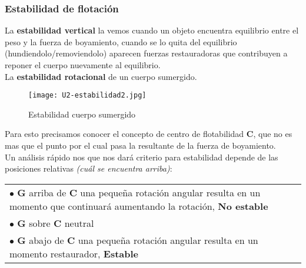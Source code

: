 \subsubsection{Estabilidad de flotación}
La \textbf{estabilidad vertical} la vemos cuando un objeto encuentra equilibrio entre el peso y la fuerza de boyamiento, cuando se lo quita del equilibrio (hundiendolo/removiendolo) aparecen fuerzas restauradoras que contribuyen a reponer el cuerpo nuevamente al equilibrio.\\
La \textbf{estabilidad rotacional} de un cuerpo sumergido.

\begin{figure}[!h]
	\centering
	\texttt{[image: U2-estabilidad2.jpg]}
	\caption{Estabilidad cuerpo sumergido}
	\label{fig:est-cuerp-sum}
\end{figure}


Para esto precisamos conocer el concepto de centro de flotabilidad $\textbf{C}$, que no es mas que el punto por el cual pasa la resultante de la fuerza de boyamiento.\\
Un análisis rápido nos que nos dará criterio para estabilidad depende de las posiciones relativas \textit{(cuál se encuentra arriba)}:\\
\begin{tabular}{p{\textwidth}}
	$\bullet$ $\textbf{G}$ arriba de $\textbf{C}$ una pequeña rotación angular resulta en un momento que continuará aumentando la rotación, \textbf{No estable}\\
	$\bullet$ $\textbf{G}$ sobre  $\textbf{C}$ neutral\\
	$\bullet$ $\textbf{G}$ abajo de $\textbf{C}$ una pequeña rotación angular resulta en un momento restaurador, \textbf{Estable}\\
\end{tabular}\\

